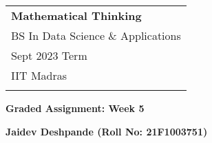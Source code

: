 \documentclass[a4paper,12pt]{article} %
\begin{document}
\thispagestyle{empty} %

\begin{tabular}{p{15.5cm}} %
{\large \bf Mathematical Thinking} \\
BS In Data Science \& Applications  \\ Sept 2023 Term  \\ IIT Madras\\
\hline %
\\
\end{tabular} %

\vspace*{0.3cm} %

\begin{center} %
	{\Large \bf Graded Assignment: Week 5} %
	\vspace{2mm}
	
	{\bf Jaidev Deshpande (Roll No: 21F1003751)} %
		
\end{center}  

\vspace{0.4cm}
\end{document}
